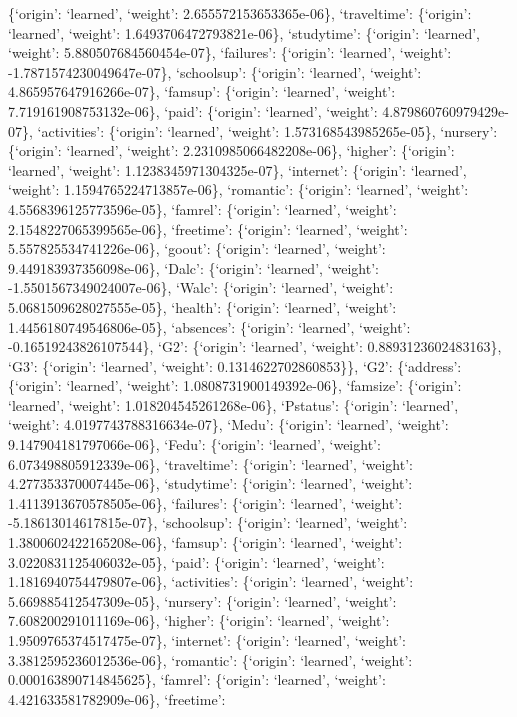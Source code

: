 \documentclass[
]{article}
\begin{document}
\{`origin': `learned', `weight': 2.655572153653365e-06\}, `traveltime':
\{`origin': `learned', `weight': 1.6493706472793821e-06\}, `studytime':
\{`origin': `learned', `weight': 5.880507684560454e-07\}, `failures':
\{`origin': `learned', `weight': -1.7871574230049647e-07\}, `schoolsup':
\{`origin': `learned', `weight': 4.865957647916266e-07\}, `famsup':
\{`origin': `learned', `weight': 7.719161908753132e-06\}, `paid':
\{`origin': `learned', `weight': 4.879860760979429e-07\}, `activities':
\{`origin': `learned', `weight': 1.573168543985265e-05\}, `nursery':
\{`origin': `learned', `weight': 2.2310985066482208e-06\}, `higher':
\{`origin': `learned', `weight': 1.1238345971304325e-07\}, `internet':
\{`origin': `learned', `weight': 1.1594765224713857e-06\}, `romantic':
\{`origin': `learned', `weight': 4.5568396125773596e-05\}, `famrel':
\{`origin': `learned', `weight': 2.1548227065399565e-06\}, `freetime':
\{`origin': `learned', `weight': 5.557825534741226e-06\}, `goout':
\{`origin': `learned', `weight': 9.449183937356098e-06\}, `Dalc':
\{`origin': `learned', `weight': -1.5501567349024007e-06\}, `Walc':
\{`origin': `learned', `weight': 5.0681509628027555e-05\}, `health':
\{`origin': `learned', `weight': 1.4456180749546806e-05\}, `absences':
\{`origin': `learned', `weight': -0.16519243826107544\}, `G2':
\{`origin': `learned', `weight': 0.8893123602483163\}, `G3': \{`origin':
`learned', `weight': 0.1314622702860853\}\}, `G2': \{`address':
\{`origin': `learned', `weight': 1.0808731900149392e-06\}, `famsize':
\{`origin': `learned', `weight': 1.018204545261268e-06\}, `Pstatus':
\{`origin': `learned', `weight': 4.0197743788316634e-07\}, `Medu':
\{`origin': `learned', `weight': 9.147904181797066e-06\}, `Fedu':
\{`origin': `learned', `weight': 6.073498805912339e-06\}, `traveltime':
\{`origin': `learned', `weight': 4.277353370007445e-06\}, `studytime':
\{`origin': `learned', `weight': 1.4113913670578505e-06\}, `failures':
\{`origin': `learned', `weight': -5.18613014617815e-07\}, `schoolsup':
\{`origin': `learned', `weight': 1.3800602422165208e-06\}, `famsup':
\{`origin': `learned', `weight': 3.0220831125406032e-05\}, `paid':
\{`origin': `learned', `weight': 1.1816940754479807e-06\}, `activities':
\{`origin': `learned', `weight': 5.669885412547309e-05\}, `nursery':
\{`origin': `learned', `weight': 7.608200291011169e-06\}, `higher':
\{`origin': `learned', `weight': 1.9509765374517475e-07\}, `internet':
\{`origin': `learned', `weight': 3.3812595236012536e-06\}, `romantic':
\{`origin': `learned', `weight': 0.000163890714845625\}, `famrel':
\{`origin': `learned', `weight': 4.421633581782909e-06\}, `freetime':
\end{document}

